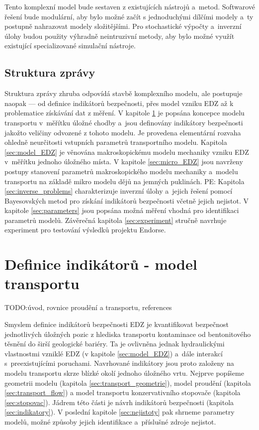 \documentclass{article}
\def\todo#1{{TODO:\color{violet}#1}}
\newcommand{\pe}[1]{{\color{orange} PE: #1}}
\begin{document}
Tento komplexní model bude sestaven z existujících nástrojů a~metod. Softwarové řešení bude modulární, aby bylo možné začít s
jednoduchými dílčími modely a~ty postupně nahrazovat modely složitějšími. Pro stochastické výpočty a~inverzní úlohy budou 
použity výhradně neintruzivní metody, aby bylo možné využít existující specializované simulační nástroje.

    
\subsection{Struktura zprávy}
Struktura zprávy zhruba odpovídá stavbě komplexního modelu, ale postupuje naopak --- od definice indikátorů bezpečnosti,
přes model vzniku EDZ až k problematice získávání dat z měření. 
V kapitole \ref{sec:transport} je popsána koncepce modelu transportu v~měřítku úložné chodby a~jsou
definovány indikátory bezpečnosti jakožto veličiny odvozené z tohoto modelu. Je provedena elementární rozvaha ohledně 
neurčitosti vstupních parametrů transportního modelu. Kapitola
\ref{sec:model_EDZ} je věnována makroskopickému modelu mechaniky vzniku EDZ v~měřítku jednoho úložného místa. 
V kapitole \ref{sec:micro_EDZ} jsou navrženy postupy stanovení parametrů makroskopického modelu mechaniky a~modelu transportu 
na základě mikro modelu dějů na jemných puklinách.
\pe{Kapitola \ref{sec:inverse_problems} charakterizuje inverzní úlohy a~jejich řešení pomocí Bayesovských metod 
pro získání indikátorů bezpečnosti včetně jejich nejistot.}
V kapitole \ref{sec:parameters} jsou popsána možná měření vhodná pro identifikaci 
parametrů modelů. Závěrečná kapitola \ref{sec:experiment} stručně navrhuje experiment pro testování výsledků projektu Endorse.


\section{Definice indikátorů - model transportu}
\label{sec:transport}
\todo{úvod, rovnice proudění a transportu, references}

Smyslem definice indikátorů bezpečnosti EDZ je kvantifikovat bezpečnost jednotlivých úložných pozic z hlediska 
transportu kontaminace od bentonitového těsnění do širší geologické bariéry. Ta je ovlivněna jednak hydraulickými vlastnostmi
vzniklé EDZ (v kapitole \ref{sec:model_EDZ}) a~dále interakcí s~preexistujícími poruchami. 
Navrhované indikátory jsou proto založeny na modelu transportu skrze blízké okolí jednoho úložného vrtu. 
Nejprve popíšeme geometrii modelu (kapitola  \ref{sec:transport_geometrie}), model proudění (kapitola \ref{sec:transport_flow})
a model transportu konzervativního stopovače (kapitola \ref{sec:stopovac}). Jádrem této části je návrh indikátorů bezpečnosti (kapitola \ref{sec:indikatory}). 
V poslední kapitole \ref{sec:nejistoty} pak shrneme parametry modelů, možné způsoby jejich identifikace a~příslušné zdroje nejistot.
\end{document}
